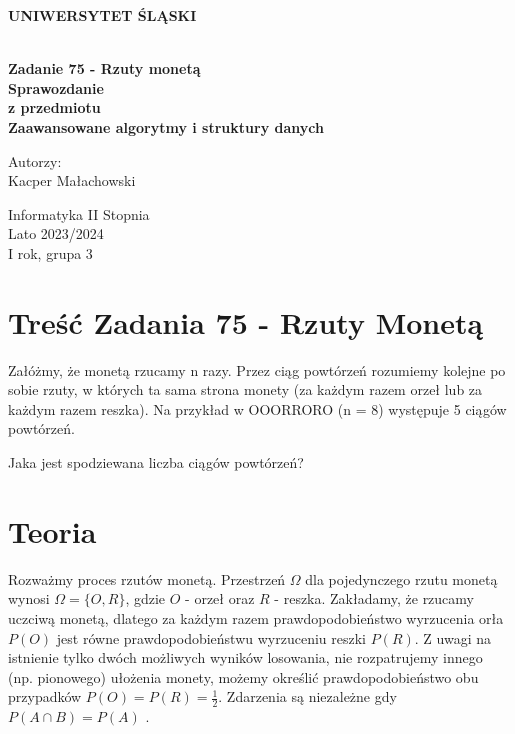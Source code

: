 \documentclass[12pt,oneside,a4paper]{book} %
\theoremstyle{break}
\begin{document}
\thispagestyle{empty}
\begin{center}
  \Large
  \bf{UNIWERSYTET ŚLĄSKI}\\
  \bf{}\\[25mm]
  \large

  \bf{Zadanie 75 - Rzuty monetą}\\[35mm]

  Sprawozdanie\\
  z przedmiotu\\
  Zaawansowane algorytmy i struktury danych\\[25mm]
\end{center}
\begin{flushright}
  \large
  Autorzy:\\
  Kacper Małachowski\\
\end{flushright}
\vspace*{\fill}
\begin{center}
  Informatyka II Stopnia\\
  Lato 2023/2024\\
  I rok, grupa 3\\[25mm]
\end{center}

\chapter*{Treść Zadania 75 - Rzuty Monetą}

Załóżmy, że monetą rzucamy n razy. Przez ciąg powtórzeń rozumiemy kolejne po sobie rzuty, w których ta sama strona monety (za każdym razem orzeł lub za każdym razem reszka). Na przykład w OOORRORO (n = 8) występuje 5 ciągów powtórzeń.

Jaka jest spodziewana liczba ciągów powtórzeń?

\chapter*{Teoria}

Rozważmy proces rzutów monetą. Przestrzeń $\Omega$ dla pojedynczego rzutu monetą wynosi $\Omega=\{O, R\}$, gdzie $O$ - orzeł oraz $R$ - reszka. Zakładamy, że rzucamy uczciwą monetą, dlatego za każdym razem prawdopodobieństwo wyrzucenia orła $P(O)$ jest równe prawdopodobieństwu wyrzuceniu reszki $P(R)$. Z uwagi na istnienie tylko dwóch możliwych wyników losowania, nie rozpatrujemy innego (np. pionowego) ułożenia monety, możemy określić prawdopodobieństwo obu przypadków $P(O)=P(R)=\frac{1}{2}$.
Zdarzenia są niezależne gdy $P(A \cap B) = P(A)$ \cite{MetProb}.
\end{document}
